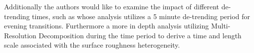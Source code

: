 \documentclass[]{article}
\begin{document}
 
 Additionally the authors would like to examine the impact of different de-trending times, such as \citep{jensen2016observations} whose analysis utilizes a 5 minute de-trending period for evening transitions. Furthermore a more in depth analysis utilizing Multi-Resolution Decomposition during the time period  to derive a time and length scale associated with the surface roughness heterogeneity. 

\newpage


\end{document}
